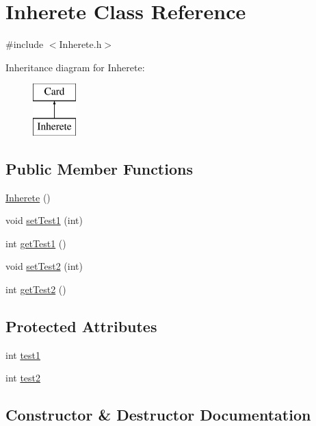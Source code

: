 \hypertarget{class_inherete}{}\section{Inherete Class Reference}
\label{class_inherete}


{\ttfamily \#include $<$Inherete.\+h$>$}

Inheritance diagram for Inherete\+:\begin{figure}[H]
\begin{center}
\leavevmode
\includegraphics[height=2.000000cm]{class_inherete}
\end{center}
\end{figure}
\subsection*{Public Member Functions}
\begin{DoxyCompactItemize}
\item 
\hyperlink{class_inherete_ad6ec31af18bd655c024e6572dba5dc1b}{Inherete} ()
\item 
void \hyperlink{class_inherete_a0952f09588eed23f2c9ff449d6cb1166}{set\+Test1} (int)
\item 
int \hyperlink{class_inherete_ab68de696572168fd0e000769925c578f}{get\+Test1} ()
\item 
void \hyperlink{class_inherete_ad1f7eeac2bc911bd5746a28648c6a98d}{set\+Test2} (int)
\item 
int \hyperlink{class_inherete_a351b5ccefdd1f0dbe1bfcac0a7f98270}{get\+Test2} ()
\end{DoxyCompactItemize}
\subsection*{Protected Attributes}
\begin{DoxyCompactItemize}
\item 
int \hyperlink{class_inherete_a3c7cd588b0f27f922ab4d8ba62150f80}{test1}
\item 
int \hyperlink{class_inherete_aab5737b7592b7be0f19d1268d86df269}{test2}
\end{DoxyCompactItemize}


\subsection{Constructor \& Destructor Documentation}
\hypertarget{class_inherete_ad6ec31af18bd655c024e6572dba5dc1b}{}\label{class_inherete_ad6ec31af18bd655c024e6572dba5dc1b} 

